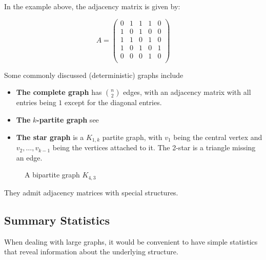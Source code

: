 \documentclass{article}
\begin{document}
In the example above, the adjacency matrix is given by:

\begin{equation*}
        A=\begin{pmatrix}
         0&  1&  1&  1& 0\\
         1&  0&  1&  0& 0\\
         1&  1&  0&  1& 0\\
         1&  0&  1&  0& 1\\
         0&  0&  0&  1& 0\\
    \end{pmatrix}
    \label{tab:adj}
\end{equation*}


Some commonly discussed (deterministic) graphs include
\begin{itemize}
    \item \textbf{The complete graph} has $\binom{n}{2}$ edges, with an adjacency matrix with all entries being $1$ except for the diagonal entries. 
    \item \textbf{The} $k$\textbf{-partite graph} see \citep{DiestelReinhard2017GT}
    \item \textbf{The star graph} is a $K_{1,k}$ partite graph, with $v_1$ being the central vertex and $v_2, \ldots, v_{k-1}$ being the vertices attached to it. The 2-star is a triangle missing an edge. 
\end{itemize}


\begin{figure}[H]
    \centering
    \caption{A bipartite graph $K_{4,3}$}
    \label{fig: example bipartite}
\end{figure}


They admit adjacency matrices with special structures.

\subsection{Summary Statistics}
When dealing with large graphs, it would be convenient to have simple statistics that reveal information about the underlying structure.  
\end{document}

